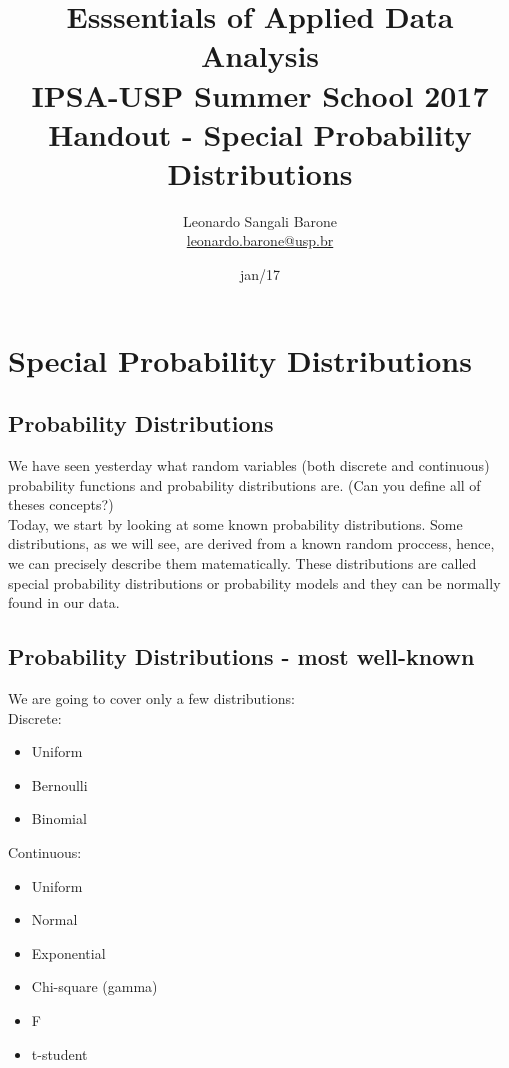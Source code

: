 \documentclass[11pt]{article}
\title{\textbf{Esssentials of Applied Data Analysis\\
				IPSA-USP Summer School 2017}\newline\\
				Handout - Special Probability Distributions}
\author{Leonardo Sangali Barone\\ \href{leonardo.barone@usp.br}{leonardo.barone@usp.br}}
\date{jan/17}
\begin{document}
\maketitle

\section*{Special Probability Distributions}

	\subsection*{Probability Distributions}
	We have seen yesterday what random variables (both discrete and continuous) probability functions and probability distributions are. (Can you define all of theses concepts?)
	\newline\\
	Today, we start by looking at some known probability distributions. Some distributions, as we will see, are derived from a known random proccess, hence, we can precisely describe them matematically. These distributions are called special probability distributions or probability models and they can be normally found in our data.

	\subsection*{Probability Distributions - most well-known}
	We are going to cover only a few distributions:\\

	Discrete: 
	\begin{itemize}
		\item Uniform
		\item Bernoulli
		\item Binomial
	\end{itemize}
	
	Continuous:
	\begin{itemize}
		\item Uniform
		\item Normal
		\item Exponential
		\item Chi-square (gamma)
		\item F
		\item t-student
	\end{itemize}
		
\end{document}
